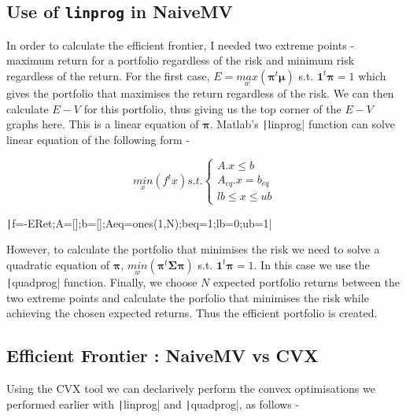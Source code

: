 \documentclass[11pt]{article}
\begin{document}
\subsection{Use of \texttt{linprog} in NaiveMV}

In order to calculate the efficient frontier, I needed two extreme points - maximum return for a 
portfolio regardless of the risk and minimum risk regardless of the return. For the first case,
$E = \underset{w}{max}(\bm{\pi}^t\bm{\mu})$ s.t. $\bm{1}^t\bm{\pi} = 1$ which gives the portfolio that 
maximises the return regardless of the risk. We can then calculate $E-V$ for this portfolio, thus giving
us the top corner of the $E-V$ graphs here. This is a linear equation of $\bm{\pi}$. Matlab's
\texttt|linprog| function can solve linear equation of the following form -

\begin{minipage}{.4\textwidth}
  	\[
		\underset{x}{min}(f^tx) s.t. 
	\begin{cases}
		A.x \leq b\\
		A_{eq}.x = b_{eq}\\
		lb \leq x \leq ub
	\end{cases}
	\]
\end{minipage}%
\begin{minipage}{.6\textwidth}
  	\texttt|f=-ERet;A=[];b=[];Aeq=ones(1,N);beq=1;lb=0;ub=1|
\end{minipage}

However, to calculate the portfolio that minimises the risk we need to solve a quadratic equation of 
$\bm{\pi}$, $\underset{w}{min}(\bm{\pi}^t\bm{\Sigma}\bm{\pi})$ s.t. $\bm{1}^t\bm{\pi} = 1$. In this case we use the
\texttt|quadprog| function. Finally, we choose $N$ expected portfolio returns between the two extreme
points and calculate the porfolio that minimises the risk while achieving the chosen expected returns.
Thus the efficient portfolio is created.

\subsection{Efficient Frontier : NaiveMV vs CVX}

Using the CVX tool we can declarively perform the convex optimisations we performed earlier with
\texttt|linprog| and \texttt|quadprog|, as follows -

\vspace{0.5cm}
\end{document}
